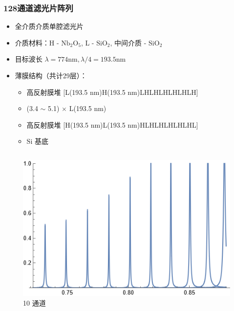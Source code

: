 \begin{frame}[c]
    \frametitle{128通道滤光片阵列}
    \begin{itemize}
        \item 全介质介质单腔滤光片
        \item 介质材料：H - $\mathrm{Nb_2O_5}$, L - $\mathrm{SiO_2}$, 中间介质 - $\mathrm{SiO_2}$
        \item 目标波长 $\lambda = 774 \text{nm}, \lambda/4 = 193.5 \text{nm}$
        \item 薄膜结构（共计29层）：\begin{itemize}
                  \item 高反射膜堆 [L(193.5 nm)H(193.5 nm)LHLHLHLHLHLH]
                  \item (3.4 $\sim$ 5.1) $\times$ L(193.5 nm)
                  \item 高反射膜堆 [H(193.5 nm)L(193.5 nm)HLHLHLHLHLHL]
                  \item $\mathrm{Si}$ 基底
              \end{itemize}
    \end{itemize}
    \begin{columns}
        \begin{column}{.5\textwidth}
            \begin{figure}[H] %
                \centering %
                \includegraphics[width=1.\textwidth]{figures/128 channels of integrated filter array rapidly fabricated by using the combinatorial deposition technique_2.png} %
                \caption{10 通道} %
            \end{figure}

\end{column}
\end{columns}
\end{frame}

